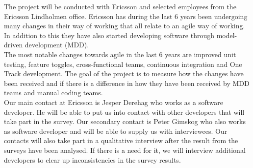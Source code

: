 \documentclass[ProjectPlan_innit.tex]{subfiles}
\begin{document}
The project will be conducted with Ericsson and selected employees from the Ericsson Lindholmen office. Ericsson has during the last 6 years been undergoing many changes in their way of working that all relate to an agile way of working. In addition to this they have also started developing software through model-driven development (MDD). 
\hspace{0pt} \\

The most notable changes towards agile in the last 6 years are improved unit testing, feature toggles, cross-functional teams, continuous integration and One Track development. The goal of the project is to measure how the changes have been received and if there is a difference in how they have been received by MDD teams and manual coding teams. 
\hspace{0pt} \\

Our main contact at Ericsson is Jesper Derehag who works as a software developer. He will be able to put us into contact with other developers that will take part in the survey. Our secondary contact is Peter Gimskog who also works as software developer and will be able to supply us with interviewees. Our contacts will also take part in a qualitative interview after the result from the surveys have been analysed. If there is a need for it, we will interview additional developers to clear up inconsistencies in the survey results. 
\end{document}
